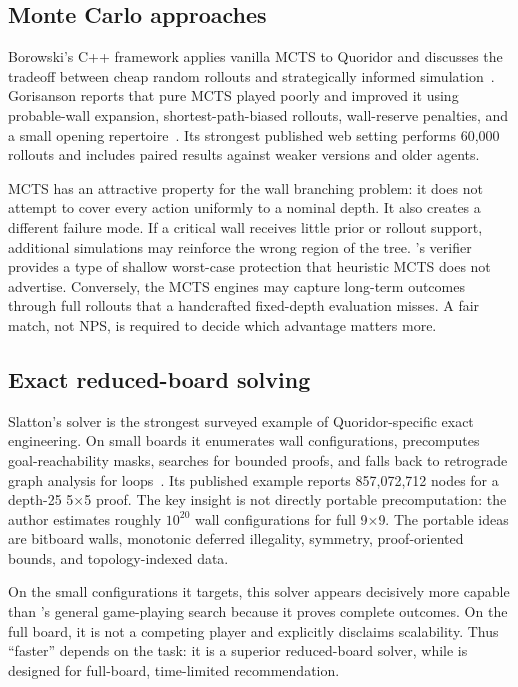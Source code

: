 \subsection{Monte Carlo approaches}
Borowski's C++ framework applies vanilla MCTS to Quoridor and discusses the tradeoff between cheap random rollouts and strategically informed simulation~\cite{borowski2021}. Gorisanson reports that pure MCTS played poorly and improved it using probable-wall expansion, shortest-path-biased rollouts, wall-reserve penalties, and a small opening repertoire~\cite{gorisanson2024}. Its strongest published web setting performs 60,000 rollouts and includes paired results against weaker versions and older agents.

MCTS has an attractive property for the wall branching problem: it does not attempt to cover every action uniformly to a nominal depth. It also creates a different failure mode. If a critical wall receives little prior or rollout support, additional simulations may reinforce the wrong region of the tree. \walwuk's verifier provides a type of shallow worst-case protection that heuristic MCTS does not advertise. Conversely, the MCTS engines may capture long-term outcomes through full rollouts that a handcrafted fixed-depth evaluation misses. A fair match, not NPS, is required to decide which advantage matters more.

\subsection{Exact reduced-board solving}
Slatton's solver is the strongest surveyed example of Quoridor-specific exact engineering. On small boards it enumerates wall configurations, precomputes goal-reachability masks, searches for bounded proofs, and falls back to retrograde graph analysis for loops~\cite{slatton2026article,slatton2026solver}. Its published example reports 857,072,712 nodes for a depth-25 5$\times$5 proof. The key insight is not directly portable precomputation: the author estimates roughly $10^{20}$ wall configurations for full 9$\times$9. The portable ideas are bitboard walls, monotonic deferred illegality, symmetry, proof-oriented bounds, and topology-indexed data.

On the small configurations it targets, this solver appears decisively more capable than \walwuk's general game-playing search because it proves complete outcomes. On the full board, it is not a competing player and explicitly disclaims scalability. Thus ``faster'' depends on the task: it is a superior reduced-board solver, while \walwuk{} is designed for full-board, time-limited recommendation.

